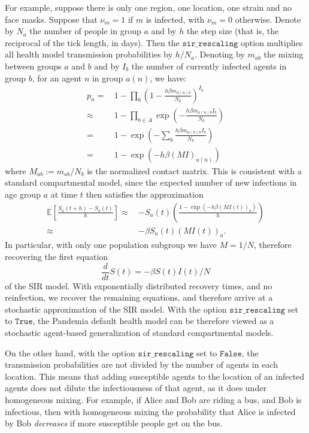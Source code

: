 \documentclass[10pt,letterpaper]{article}
\begin{document}
For example, suppose there is only one region, one location, one strain and no face masks. Suppose that $\nu_m = 1$ if $m$ is infected, with $\nu_m = 0$ otherwise. Denote by $N_{a}$ the number of people in group $a$ and by $h$ the step size (that is, the reciprocal of the tick length, in days). Then the $\texttt{sir{\_}rescaling}$ option multiplies all health model transmission probabilities by $h / N_a$. Denoting by $m_{ab}$ the mixing between groups $a$ and $b$ and by $I_b$ the number of currently infected agents in group $b$, for an agent $n$ in group $a(n)$, we have:
\begin{align} \nonumber
p_n =\, & 1 - \prod_{b} \left(1 - \frac{h \beta m_{a(n) b}}{N_b}\right)^{I_b} \\ \nonumber
\approx\, & 1 - \prod_{b \in A} \exp \left(-\frac{h\beta m_{a(n)b} I_b}{N_b}\right)\\ \nonumber
 = \, & 1 - \exp \left(- \sum_{b} \frac{h\beta m_{a(n)b} I_b}{N_b}\right)\\[2mm] \nonumber
 = \, & 1 - \exp \left(- h\beta (MI)_{a(n)}\right) \nonumber
\end{align}
where $M_{ab} := m_{ab} / N_b$ is the normalized contact matrix. This is consistent with a standard compartmental model, since the expected number of new infections in age group $a$ at time $t$ then satisfies the approximation
\begin{align} \nonumber
\mathbb{E}\left[\frac{S_a(t+h) - S_a(t)}{h}\right] \approx\, & -S_a(t)\left(\frac{1 - \exp \left(- h\beta (MI(t))_{a}\right)}{h}\right)\\[2mm] \nonumber
\approx\, & -\beta S_a(t) (MI(t))_a. \nonumber
\end{align}
In particular, with only one population subgroup we have $M = 1 / N$, therefore recovering the first equation
\begin{equation*}
\frac{d}{dt} S(t) = - \beta S(t)I(t) / N
\end{equation*}
of the SIR model. With exponentially distributed recovery times, and no reinfection, we recover the remaining equations, and therefore arrive at a stochastic approximation of the SIR model. With the option $\texttt{sir{\_}rescaling}$ set to $\texttt{True}$, the Pandemia default health model can be therefore viewed as a stochastic agent-based generalization of standard compartmental models.

On the other hand, with the option $\texttt{sir{\_}rescaling}$ set to $\texttt{False}$, the transmission probabilities are not divided by the number of agents in each location. This means that adding susceptible agents to the location of an infected agents does not dilute the infectiousness of that agent, as it does under homogeneous mixing. For example, if Alice and Bob are riding a bus, and Bob is infectious, then with homogeneous mixing the probability that Alice is infected by Bob \textit{decreases} if more susceptible people get on the bus.
\end{document}

